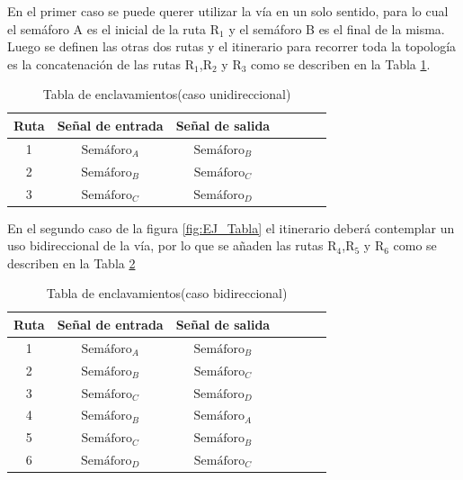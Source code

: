	En el primer caso se puede querer utilizar la vía en un solo sentido, para lo cual el semáforo A es el inicial de la ruta $\text{R}_1$ y el semáforo B es el final de la misma. Luego se definen las otras dos rutas y el itinerario para recorrer toda la topología es la concatenación de las rutas $\text{R}_1$,$\text{R}_2$ y $\text{R}_3$ como se describen en la Tabla \ref{Tabla_simple}.
	
	\begin{table}[!hbt]
	\renewcommand{\arraystretch}{1.3}

	\caption{Tabla de enclavamientos(caso unidireccional)}
	\label{Tabla_simple}
	\centering

	\begin{tabular}{c c c c c c c}
	\hline
	Ruta & Señal de entrada & Señal de salida \\
	\hline
	 1 & $\text{Semáforo}_A$  & $\text{Semáforo}_B$ \\
	 2 & $\text{Semáforo}_B$  & $\text{Semáforo}_C$ \\
	 3 & $\text{Semáforo}_C$  & $\text{Semáforo}_D$ \\
	\hline
	\end{tabular}
	\end{table}
	
	En el segundo caso de la figura \ref{fig:EJ_Tabla} el itinerario deberá contemplar un uso bidireccional de la vía, por lo que se añaden las rutas $\text{R}_4$,$\text{R}_5$ y $\text{R}_6$ como se describen en la Tabla \ref{Tabla_bidireccional}
	
	\begin{table}[!hbt]
	\renewcommand{\arraystretch}{1.3}

	\caption{Tabla de enclavamientos(caso bidireccional)}
	\label{Tabla_bidireccional}
	\centering

	\begin{tabular}{c c c c c c c}
	\hline
	Ruta & Señal de entrada & Señal de salida \\
	\hline
	 1 & $\text{Semáforo}_A$  & $\text{Semáforo}_B$ \\
	 2 & $\text{Semáforo}_B$  & $\text{Semáforo}_C$ \\
	 3 & $\text{Semáforo}_C$  & $\text{Semáforo}_D$ \\
	 4 & $\text{Semáforo}_B$  & $\text{Semáforo}_A$ \\
	 5 & $\text{Semáforo}_C$  & $\text{Semáforo}_B$ \\
	 6 & $\text{Semáforo}_D$  & $\text{Semáforo}_C$ \\
	\hline
	\end{tabular}
	\end{table}
	
